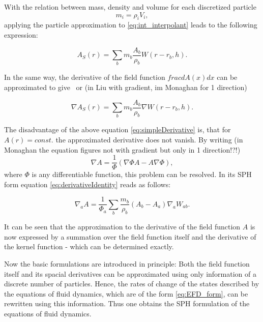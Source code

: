 \documentclass{report}
\begin{document}
With the relation between mass, density and volume for each discretized particle
\begin{equation}
m_i=\rho_i V_i,
\end{equation}
applying the particle approximation to \ref{eq:int_interpolant} leads to the following expression:

\begin{equation}
\label{eq:intInter}
A_S(r)=\sum_b m_b \frac{A_b}{\rho_b}W(r-r_b,h).
\end{equation}


In the same way, the derivative of the field function $frac{dA(x)}{dx}$ can be
approximated to give~\cite{Monaghan2005} or \cite{Liu2003} (in Liu with gradient,
im Monaghan for 1 direction)

\begin{equation}
\label{eq:simpleDerivative}
\nabla A_S(r)=\sum_b m_b \frac{A_b}{\rho_b}\nabla W(r-r_b,h).
\end{equation}

The disadvantage of the above equation \ref{eq:simpleDerivative} is, that for
$A(r)=const.$ the approximated derivative does not vanish. By writing (in
Monaghan the equation figures not with gradient but only in 1 direction!?!)
\begin{equation}
\label{eq:derivativeIdentity}
\nabla A = \frac{1}{\Phi}(\nabla {\Phi A}-A\nabla \Phi),
\end{equation}
where $\Phi$ is any differentiable function, this problem can be resolved. In its
SPH form  equation \ref{eq:derivativeIdentity} reads as follows:

\begin{equation}
\nabla_a A = \frac{1}{\Phi_a}\sum_b \frac{m_b}{\rho_b}(A_b-A_a)\nabla_a W_{ab}.
\end{equation}


It can be seen that the approximation to the derivative of the
field function $A$ is now expressed by a summation over the field function itself
and the derivative of the kernel function - which can be determined exactly.

Now the basic formulations are introduced in principle: Both the field function
itself and its spacial derivatives can be approximated using only information 
of a discrete number of particles. Hence, the rates of change of
the states described by the equations of fluid dynamics, which are of the form
\ref{eq:EFD_form}, can be rewritten using this information. Thus 
one obtains the SPH formulation of the equations of fluid dynamics.
\end{document}
